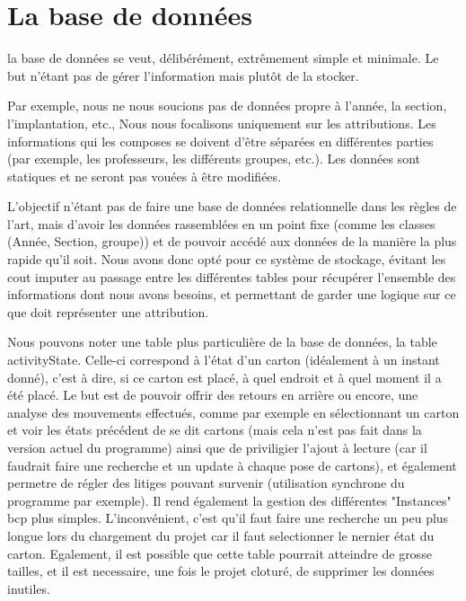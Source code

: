 \chapter{La base de données}
la base de données se veut, délibérément, extrêmement simple et minimale. Le but n'étant pas de gérer l'information mais plutôt de la stocker.

Par exemple, nous ne nous soucions pas de données propre à l'année, la section, l'implantation, etc.,  Nous nous focalisons uniquement sur les attributions. Les informations qui les composes se doivent d'être séparées en différentes parties (par exemple, les professeurs, les différents groupes, etc.). Les données sont statiques et ne seront pas vouées à être modifiées.

L'objectif n'étant pas de faire une base de données relationnelle dans les règles de l'art, mais d'avoir les données rassemblées en un point fixe (comme les classes (Année, Section, groupe)) et de pouvoir accédé aux données de la manière la plus rapide qu'il soit. Nous avons donc opté pour ce système de stockage, évitant les cout imputer au passage entre les différentes tables pour récupérer l'ensemble des informations dont nous avons besoins, et permettant de garder une logique sur ce que doit représenter une attribution.

Nous pouvons noter une table plus particulière de la base de données, la table activityState. Celle-ci correspond à l'état d'un carton (idéalement à un instant donné), c'est à dire, si ce carton est placé, à quel endroit et à quel moment il a été placé.  Le but est de pouvoir offrir des retours en arrière ou encore, une analyse des mouvements effectués, comme par exemple en sélectionnant un carton et voir les états précédent de se dit cartons (mais cela n'est pas fait dans la version actuel du programme) ainsi que de priviligier l'ajout à lecture (car il faudrait faire une recherche et un update à chaque pose de cartons), et également permetre de régler des litiges pouvant survenir (utilisation synchrone du programme par exemple).  Il rend également la gestion des différentes "Instances" bcp plus simples.  L'inconvénient, c'est qu'il faut faire une recherche un peu plus longue lors du chargement du projet car il faut selectionner le nernier état du carton. Egalement, il est possible que cette table pourrait atteindre de grosse tailles, et il est necessaire, une fois le projet cloturé, de supprimer les données inutiles. 

